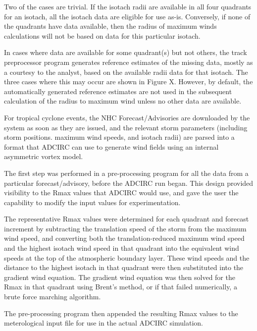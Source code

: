 \documentclass[12pt]{article}
\begin{document}
Two of the cases are trivial. If the isotach radii are available in 
all four quadrants for an isotach, all the isotach data are eligible 
for use as-is. Conversely, if none of the quadrants have data 
available, then the radius of maximum winds calculations will not be 
based on data for this particular isotach. 

In cases where data are available for some quadrant(s) but not 
others, the track preprocessor program generates reference estimates 
of the missing data, mostly as a courtesy to the analyst, based on 
the available radii data for that isotach. The three cases where 
this may occur are shown in Figure X. However, by default, the 
automatically generated reference estimates are not used in the 
subsequent calculation of the radius to maximum wind unless no other 
data are available. 

For tropical cyclone events, the NHC Forecast/Advisories are 
downloaded by the system as soon as they are issued, and the 
relevant storm parameters (including storm positions. maximum wind 
speeds, and isotach radii) are parsed into a format that ADCIRC can 
use to generate wind fields using an internal asymmetric vortex 
model. 


The first step was performed in a pre-processing program for all the 
data from a particular forecast/advisory, before the ADCIRC run 
began. This design provided visibility to the Rmax values that 
ADCIRC would use, and gave the user the capability to modify the 
input values for experimentation.

The representative Rmax values were determined for each quadrant and 
forecast increment by subtracting the translation speed of the storm 
from the maximum wind speed, and converting both the 
translation-reduced maximum wind speed and the highest isotach wind 
speed in that quadrant into the equivalent wind speeds at the top of 
the atmospheric boundary layer. These wind speeds and the distance 
to the highest isotach in that quadrant were then substituted into 
the gradient wind equation. The gradient wind equation was then 
solved for the Rmax in that quadrant using Brent's method, or if 
that failed numerically, a brute force marching algorithm.

The pre-processing program then appended the resulting Rmax values 
to the meterological input file for use in the actual ADCIRC 
simulation.
\end{document}
